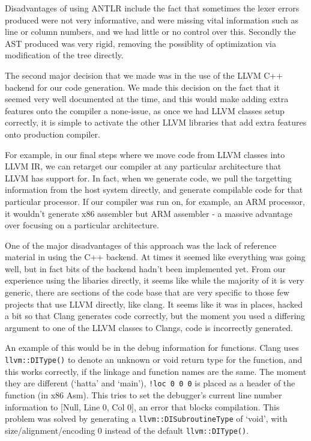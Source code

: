 \documentclass[a4wide, 11pt]{article}
\begin{document}
Disadvantages of using ANTLR include the fact that sometimes the lexer errors produced were not very informative, and were missing vital information such as line or column numbers, and we had little or no control over this. Secondly the AST produced was very rigid, removing the possiblity of optimization via modification of the tree directly.

The second major decision that we made was in the use of the LLVM C++ backend for our code generation. We made this decision on the fact that it seemed very well documented at the time, and this would make adding extra features onto the compiler a none-issue, as once we had LLVM classes setup correctly, it is simple to activate the other LLVM libraries that add extra features onto production compiler. 

For example, in our final steps where we move code from LLVM classes into LLVM IR, we can retarget our compiler at any particular architecture that LLVM has support for. In fact, when we generate code, we pull the targetting information from the host system directly, and generate compilable code for that particular processor. If our compiler was run on, for example, an ARM processor, it wouldn't generate x86 assembler but ARM assembler - a massive advantage over focusing on a particular architecture.

One of the major disadvantages of this approach was the lack of reference material in using the C++ backend. At times it seemed like everything was going well, but in fact bits of the backend hadn't been implemented yet. From our experience using the libaries directly, it seems like while the majority of it is very generic, there are sections of the code base that are very specific to those few projects that use LLVM directly, like clang. It seems like it was in places, hacked a bit so that Clang generates code correctly, but the moment you used a differing argument to one of the LLVM classes to Clangs, code is incorrectly generated.

An example of this would be in the debug information for functions. Clang uses \texttt{llvm::DIType()} to denote an unknown or void return type for the function, and this works correctly, if the linkage and function names are the same. The moment they are different (`hatta' and `main'), \texttt{!loc 0 0 0} is placed as a header of the function (in x86 Asm). This tries to set the debugger's current line number information to [Null, Line 0, Col 0], an error that blocks compilation. This problem was solved by generating a \texttt{llvm::DISubroutineType} of `void', with size/alignment/encoding 0 instead of the default \texttt{llvm::DIType()}. 
\end{document}
